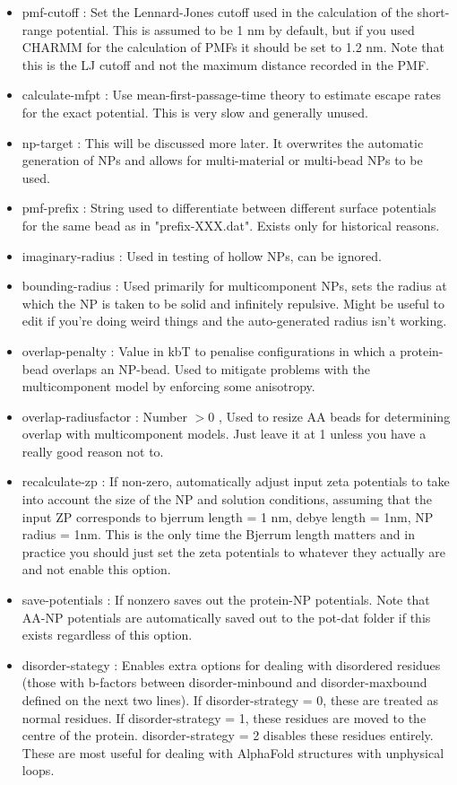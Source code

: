 \documentclass[10pt,a4paper,onecolumn]{report}
\begin{document}
\begin{itemize}
\item pmf-cutoff : Set the Lennard-Jones cutoff used in the calculation of the short-range potential. This is assumed to be 1 nm by default, but if you used CHARMM for the calculation of PMFs it should be set to 1.2 nm. Note that this is the LJ cutoff and not the maximum distance recorded in the PMF. 
\item calculate-mfpt : Use mean-first-passage-time theory to estimate escape rates for the exact potential. This is very slow and generally unused.
\item np-target : This will be discussed more later. It overwrites the automatic generation of NPs and allows for multi-material or multi-bead NPs to be used. 
\item pmf-prefix : String used to differentiate between different surface potentials for the same bead as in "prefix-XXX.dat". Exists only for historical reasons. 
\item imaginary-radius : Used in testing of hollow NPs, can be ignored.
\item bounding-radius : Used primarily for multicomponent NPs, sets the radius at which the NP is taken to be solid and infinitely repulsive. Might be useful to edit if you're doing weird things and the auto-generated radius isn't working.
\item overlap-penalty : Value in kbT to penalise configurations in which a protein-bead overlaps an NP-bead. Used to mitigate problems with the multicomponent model by enforcing some anisotropy.
\item overlap-radiusfactor : Number $> 0$ , Used to resize AA beads for determining overlap with multicomponent models. Just leave it at 1 unless you have a really good reason not to. 
\item recalculate-zp : If non-zero, automatically adjust input zeta potentials to take into account the size of the NP and solution conditions, assuming that the input ZP corresponds to bjerrum length = 1 nm, debye length = 1nm, NP radius = 1nm. This is the only time the Bjerrum length matters and in practice you should just set the zeta potentials to whatever they actually are and not enable this option. 
\item save-potentials : If nonzero saves out the protein-NP potentials. Note that AA-NP potentials are automatically saved out to the pot-dat folder if this exists regardless of this option.
\item disorder-stategy : Enables extra options for dealing with disordered residues (those with b-factors between disorder-minbound and disorder-maxbound defined on the next two lines). If disorder-strategy = 0, these are treated as normal residues. If disorder-strategy = 1, these residues are moved to the centre of the protein.  disorder-strategy = 2 disables these residues entirely. These are most useful for dealing with AlphaFold structures with unphysical loops. 

\end{itemize}
\end{document}
